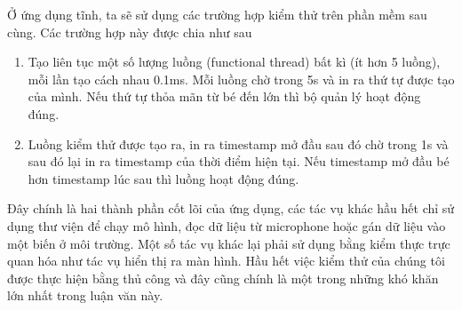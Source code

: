 	Ở ứng dụng tĩnh, ta sẽ sử dụng các trường hợp kiểm thử trên phần mềm sau cùng. Các trường hợp này được chia như sau
	
		\begin{enumerate}[1)]
			\item {} Tạo liên tục một số lượng luồng (functional thread) bất kì (ít hơn 5 luồng), mỗi lần tạo cách nhau 0.1ms. Mỗi luồng chờ trong 5s và in ra thứ tự được tạo của mình. Nếu thứ tự thỏa mãn từ bé đến lớn thì bộ quản lý hoạt động đúng.
			\item {} Luồng kiểm thử được tạo ra, in ra timestamp mở đầu sau đó chờ trong 1s và sau đó lại in ra timestamp của thời điểm hiện tại. Nếu timestamp mở đầu bé hơn timestamp lúc sau thì luồng hoạt động đúng.
		\end{enumerate}
	
	Đây chính là hai thành phần cốt lõi của ứng dụng, các tác vụ khác hầu hết chỉ sử dụng thư viện để chạy mô hình, đọc dữ liệu từ microphone hoặc gán dữ liệu vào một biến ở môi trường. Một số tác vụ khác lại phải sử dụng bằng kiểm thực trực quan hóa như tác vụ hiển thị ra màn hình. Hầu hết việc kiểm thử của chúng tôi được thực hiện bằng thủ công và đây cũng chính là một trong những khó khăn lớn nhất trong luận văn này.
	